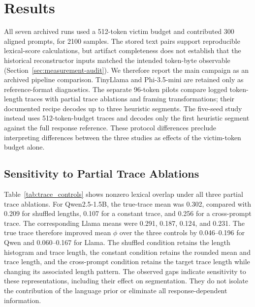 \documentclass[electronics,article,submit,pdftex,moreauthors]{Definitions/mdpi}
\begin{document}
\section{Results}
All seven archived runs used a 512-token victim budget and contributed 300 aligned prompts, for 2100 samples. The stored text pairs support reproducible lexical-score calculations, but artifact completeness does not establish that the historical reconstructor inputs matched the intended token-byte observable (Section~\ref{sec:measurement-audit}). We therefore report the main campaign as an archived pipeline comparison. TinyLlama and Phi-3.5-mini are retained only as reference-format diagnostics. The separate 96-token pilots compare logged token-length traces with partial trace ablations and framing transformations; their documented recipe decodes up to three heuristic segments. The five-seed study instead uses 512-token-budget traces and decodes only the first heuristic segment against the full response reference. These protocol differences preclude interpreting differences between the three studies as effects of the victim-token budget alone.

\subsection{Sensitivity to Partial Trace Ablations}
Table~\ref{tab:trace_controls} shows nonzero lexical overlap under all three partial trace ablations. For Qwen2.5-1.5B, the true-trace mean was 0.302, compared with 0.209 for shuffled lengths, 0.107 for a constant trace, and 0.256 for a cross-prompt trace. The corresponding Llama means were 0.291, 0.187, 0.124, and 0.231. The true trace therefore improved mean $\phi$ over the three controls by 0.046--0.196 for Qwen and 0.060--0.167 for Llama. The shuffled condition retains the length histogram and trace length, the constant condition retains the rounded mean and trace length, and the cross-prompt condition retains the target trace length while changing its associated length pattern. The observed gaps indicate sensitivity to these representations, including their effect on segmentation. They do not isolate the contribution of the language prior or eliminate all response-dependent information.
\end{document}
